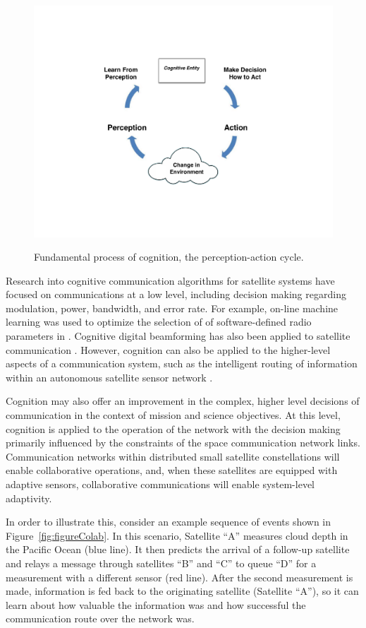 \documentclass[conference]{IEEEtran}
\begin{document}
\begin{figure}[t!]
  \begin{center}
    \includegraphics[width=0.8\linewidth] {images/Figure1.pdf} \\
  \end{center}
  \caption{Fundamental process of cognition, the perception-action cycle.}
  \label{fig:figure1}
\end{figure}

Research into cognitive communication algorithms for satellite systems have
focused on communications at a low level, including decision making regarding
modulation, power, bandwidth, and error rate.  For example, on-line machine
learning was used to optimize the selection of of software-defined radio
parameters in \cite{ref4}.  Cognitive digital beamforming has also been applied
to satellite communication \cite{ref5}.  However, cognition can also be applied
to the higher-level aspects of a communication system, such as the intelligent
routing of information within an autonomous satellite sensor network
\cite{ref7}.

Cognition may also offer an improvement in the complex, higher level decisions
of communication in the context of mission and science objectives.  At this
level, cognition is applied to the operation of the network with the decision
making primarily influenced by the constraints of the space communication
network links.  Communication networks within distributed small satellite
constellations will enable collaborative operations, and, when these satellites
are equipped with adaptive sensors, collaborative communications will enable
system-level adaptivity.

In order to illustrate this, consider an example sequence of events shown in
Figure~\ref{fig:figureColab}.  In this scenario, Satellite ``A'' measures
cloud depth in the Pacific Ocean (blue line).  It then predicts the arrival of a
follow-up satellite and relays a message through satellites ``B'' and ``C'' to
queue ``D'' for a measurement with a different sensor (red line).  After the
second measurement is made, information is fed back to the originating satellite
(Satellite ``A''), so it can learn about how valuable the information was and
how successful the communication route over the network was.
\end{document}
